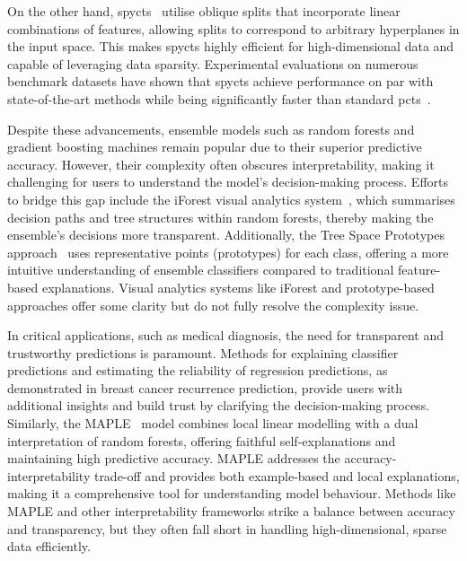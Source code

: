 \documentclass[3p,review,authoryear]{elsarticle}
\begin{document}
On the other hand, \glspl{spyct}~\citep{Stepi_nik_2021} utilise oblique splits that incorporate linear combinations of features, allowing splits to correspond to arbitrary hyperplanes in the input space.
This makes \glspl{spyct} highly efficient for high-dimensional data and capable of leveraging data sparsity.
Experimental evaluations on numerous benchmark datasets have shown that \glspl{spyct} achieve performance on par with state-of-the-art methods while being significantly faster than standard \glspl{pct}~\citep{Andonovikj_2024}.

Despite these advancements, ensemble models such as random forests and gradient boosting machines remain popular due to their superior predictive accuracy.
However, their complexity often obscures interpretability, making it challenging for users to understand the model’s decision-making process.
Efforts to bridge this gap include the iForest visual analytics system~\citep{Zhao_2019}, which summarises decision paths and tree structures within random forests, thereby making the ensemble's decisions more transparent.
Additionally, the Tree Space Prototypes approach~\citep{Tan_2020} uses representative points (prototypes) for each class, offering a more intuitive understanding of ensemble classifiers compared to traditional feature-based explanations.
Visual analytics systems like iForest and prototype-based approaches offer some clarity but do not fully resolve the complexity issue.

In critical applications, such as medical diagnosis, the need for transparent and trustworthy predictions is paramount.
Methods for explaining classifier predictions and estimating the reliability of regression predictions, as demonstrated in breast cancer recurrence prediction, provide users with additional insights and build trust by clarifying the decision-making process.
Similarly, the MAPLE~\citep{plumb2018model} model combines local linear modelling with a dual interpretation of random forests, offering faithful self-explanations and maintaining high predictive accuracy.
MAPLE addresses the accuracy-interpretability trade-off and provides both example-based and local explanations, making it a comprehensive tool for understanding model behaviour.
Methods like MAPLE and other interpretability frameworks strike a balance between accuracy and transparency, but they often fall short in handling high-dimensional, sparse data efficiently.
\end{document}

